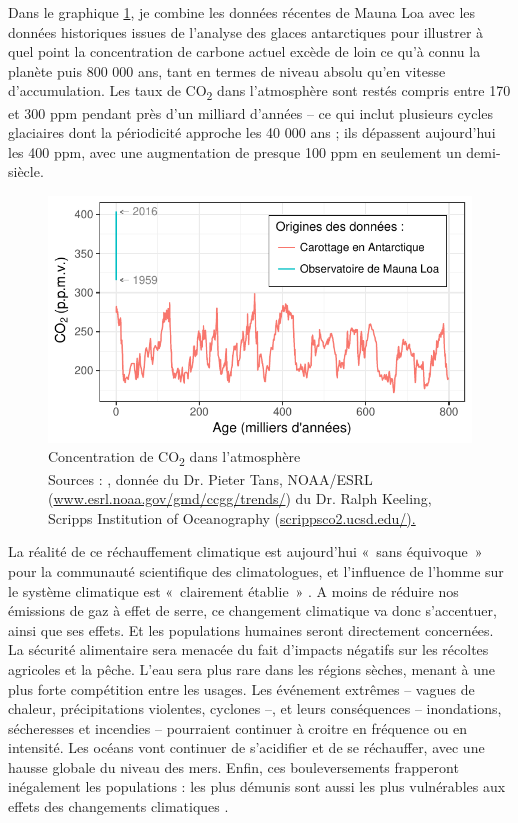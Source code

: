 Dans le graphique \ref{fig:CO2Emissions}, je combine les données récentes de Mauna Loa avec les données historiques issues de l'analyse des glaces antarctiques pour illustrer à quel point la concentration de carbone actuel excède de loin ce qu'à connu la planète puis 800 000 ans, tant en termes de niveau absolu qu'en vitesse d'accumulation. Les taux de CO\textsubscript{2} dans l'atmosphère sont restés compris entre 170 et 300 ppm pendant près d'un milliard d'années -- ce qui inclut plusieurs cycles glaciaires dont la périodicité approche les 40 000 ans ; ils dépassent aujourd'hui les 400 ppm, avec une augmentation de presque 100 ppm en seulement un demi-siècle.

\begin{figure}[!ht]
	\centering
	\includegraphics{figures/CO2Emissions.pdf}
	\caption[Concentration de CO\textsubscript{2} dans l'atmosphère]{Concentration de CO\textsubscript{2} dans l'atmosphère \\ Sources : \citet{Luthi2008}, donnée du Dr. Pieter Tans, NOAA/ESRL (\url{www.esrl.noaa.gov/gmd/ccgg/trends/}) du Dr. Ralph Keeling, Scripps Institution of Oceanography (\url{scrippsco2.ucsd.edu/).}}
	\label{fig:CO2Emissions}
\end{figure}

La réalité de ce réchauffement climatique est aujourd’hui «~sans équivoque~» pour la communauté scientifique des climatologues, et l'influence de l'homme sur le système climatique est «~clairement établie~» \citep{IPCC2014}.
A moins de réduire nos émissions de gaz à effet de serre, ce changement climatique va donc s’accentuer, ainsi que ses effets. Et les populations humaines seront directement concernées. La sécurité alimentaire sera menacée du fait d’impacts négatifs sur les récoltes agricoles et la pêche. L’eau sera plus rare dans les régions sèches, menant à une plus forte compétition entre les usages. Les événement extrêmes -- vagues de chaleur, précipitations violentes, cyclones --, et leurs conséquences -- inondations, sécheresses et incendies -- pourraient continuer à croitre en fréquence ou en intensité. Les océans vont continuer de s’acidifier et de se réchauffer, avec une hausse globale du niveau des mers. 
Enfin, ces bouleversements frapperont inégalement les populations : les plus démunis sont aussi les plus vulnérables aux effets des changements climatiques \citep{IPCC2014}.


